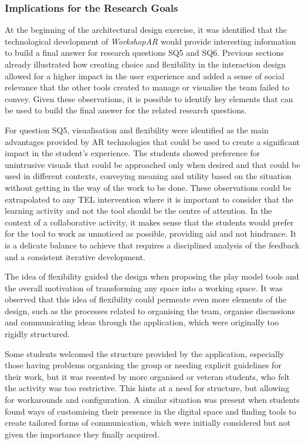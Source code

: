\subsubsection{Implications for the Research Goals \label{sec:5-2-4-3}}

At the beginning of the architectural design exercise, it was identified that the technological development of \emph{WorkshopAR} would provide interesting information to build a final
answer for research questions SQ5 and SQ6. Previous sections already illustrated how creating choice and flexibility in the interaction design allowed for a higher impact in the user
experience and added a sense of social relevance that the other tools created to manage or visualise the team failed to convey. Given these observations, it is possible to identify key
elements that can be used to build the final answer for the related research questions.

For question SQ5, visualisation and flexibility were identified as the main advantages provided by \ac{AR} technologies that could be used to create a significant impact in the student's
experience. The students showed preference for unintrusive visuals that could be approached only when desired and that could be used in different contexts, conveying meaning and utility
based on the situation without getting in the way of the work to be done. These observations could be extrapolated to any \ac{TEL} intervention where it is important to consider that the
learning activity and not the tool should be the centre of attention. In the context of a collaborative activity, it makes sense that the students would prefer for the tool to work as
unnoticed as possible, providing aid and not hindrance. It is a delicate balance to achieve that requires a disciplined analysis of the feedback and a consistent iterative development.

The idea of flexibility guided the design when proposing the play model tools and the overall motivation of transforming any space into a working space. It was observed that this idea of
flexibility could permeate even more elements of the design, such as the processes related to organising the team, organise discussions and communicating ideas through the application,
which were originally too rigidly structured.

Some students welcomed the structure provided by the application, especially those having problems organising the group or needing explicit guidelines for their work, but it was resented
by more organised or veteran students, who felt the activity was too restrictive. This hints at a need for structure, but allowing for workarounds and configuration. A similar situation
was present when students found ways of customising their presence in the digital space and finding tools to create tailored forms of communication, which were initially considered but not
given the importance they finally acquired.

